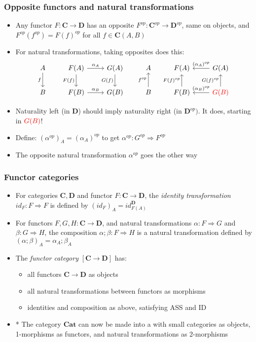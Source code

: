 \documentclass[handout]{beamer}
\newcommand{\To}{\Rightarrow}
\newcommand{\bfsf}[1]{{\boldsymbol{#1}}}
\newcommand{\CC}{\bfsf{C}}
\newcommand{\DD}{\bfsf{D}}
\newcommand{\Cat}{\bfsf{Cat}}
\begin{document}
\frame
  {   
    \frametitle{Opposite functors and natural transformations}\label{Ch3:oppnat}

 \begin{itemize}[<+->]
\item Any functor $F:\CC\to\DD$ has an opposite $F^{op}:\CC^{op}\to\DD^{op}$,
same on objects,  and $F^{op}(f^{op}) = F(f)^{op}$ for all $f\in \CC(A,B)$
\item For natural transformations, taking opposites does this:
\[
\begin{tikzcd}[ampersand replacement=\&]
A \arrow[swap]{d}{f} \& F(A)   \arrow{r}{\alpha_A}\arrow[swap]{d}{F(f)}\&\arrow[swap]{d}{G(f)} G(A)
\& A \& F(A)   \& \arrow[swap]{l}{(\alpha_A)^{op}} G(A)
\\
B \& F(B)  \arrow{r}{\alpha_B} \& G(B)
\&B  \arrow{u}{f^{op}} \& F(B) \arrow{u}{F(f)^{op}}  \&\arrow{u}{G(f)^{op}} \color{red} \arrow[swap]{l}{(\alpha_B)^{op}}G(B)
\end{tikzcd}
\]
\item Naturality left (in $\DD$) should imply naturality right (in $\DD^{op})$. 
It does, starting in $\color{red}G(B)$! 
\item Define: $(\alpha^{op})_A = (\alpha_A)^{op}$ to get $\alpha^{op}: G^{op}\To F^{op}$
\item The opposite natural transformation $\alpha^{op}$ goes the other way
 \end{itemize}

 }

\frame
  {   
    \frametitle{Functor categories}\label{Ch3:functorcats}

 \begin{itemize}[<+->]
\item For categories $\CC,\DD$ and functor $F: \CC\to\DD$, the 
\emph{identity transformation} $id_F : F\To F$ is defined by $(id_F)_A = id^\DD_{F(A)}$
\item For functors $F,G,H: \CC\to\DD$, and natural
transformations $\alpha: F\To G$ and $\beta:G\To H$, the composition
$\alpha;\beta: F\To H$ is a natural transformation defined by 
$(\alpha;\beta)_A= \alpha_A;\beta_A$
 \item The \emph{functor category} $[\CC\to\DD]$ has:
   \begin{itemize}[<+->]
\item all functors $\CC\to\DD$ as objects 
\item all natural transformations between functors as morphisms 
\item identities and composition as above, satisfying ASS and ID
   \end{itemize}
\item * The category $\Cat$ can now be made into a 
 with small categories 
as objects, 1-morphisms as functors, and natural transformations as 2-morphisms
 \end{itemize}

 }
\end{document}
